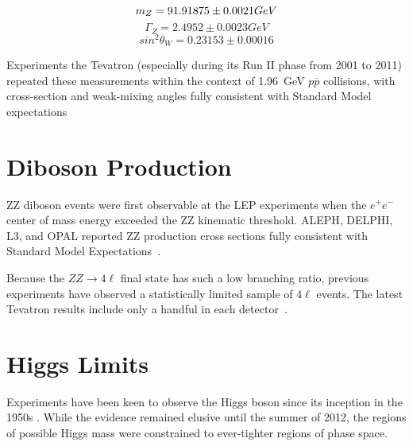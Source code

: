 \begin{equation*}
    m_Z = 91.91875 \pm 0.0021 GeV \\
\end{equation*}
\begin{equation*}
    \Gamma_Z = 2.4952 \pm 0.0023 GeV
\end{equation*}
\begin{equation*}
    sin^2 \theta_W = 0.23153 \pm 0.00016
\end{equation*}

Experiments the Tevatron (especially during its Run II phase from 2001 to 2011)
repeated these measurements within the context of 1.96~GeV $p\overline p$
collisions, with cross-section and weak-mixing angles fully consistent with
Standard Model expectations~\cite{cdf:weakMixingAngle, d0:weakMixingAngle}


\section{Diboson Production}
ZZ diboson events were first observable at the LEP experiments when the $e^+e^-$
center of mass energy exceeded the ZZ kinematic threshold. ALEPH, DELPHI, L3,
and OPAL reported ZZ production cross sections fully consistent with Standard
Model Expectations~\cite{ALEPH:zz, DELPHI:zz, L3:zz, OPAL:zz}.

Because the $ZZ\rightarrow4\ell$ final state has such a low branching ratio,
previous experiments have observed a statistically limited sample of $4\ell$
events.  The latest Tevatron results include only a handful in each
detector~\cite{CDF:zz, D0:zz}. %



\section{Higgs Limits}
Experiments have been keen to observe the Higgs boson since its inception in the
1950s \cite{PhysRevLett.13.508, PhysRevLett.13.321, PhysRevLett.13.585}. While
the evidence remained elusive until the summer of 2012, the regions of possible
Higgs mass were constrained to ever-tighter regions of phase space.

